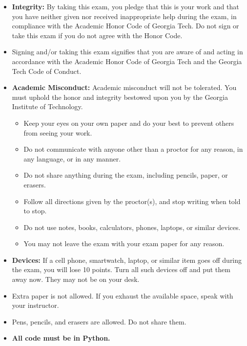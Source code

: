 \documentclass[11pt,addpoints]{exam}
\begin{document}
\begin{itemize}[leftmargin=1.35em,itemsep=0.25em,topsep=0.25em]
  \item \textbf{Integrity:} By taking this exam, you pledge that this is your work and that you have neither given nor received inappropriate help during the exam, in compliance with the Academic Honor Code of Georgia Tech. Do not sign or take this exam if you do not agree with the Honor Code.
  \item Signing and/or taking this exam signifies that you are aware of and acting in accordance with the Academic Honor Code of Georgia Tech and the Georgia Tech Code of Conduct.
  \item \textbf{Academic Misconduct:} Academic misconduct will not be tolerated. You must uphold the honor and integrity bestowed upon you by the Georgia Institute of Technology.
  \begin{itemize}[leftmargin=1.4em,itemsep=0.15em,topsep=0.15em]
    \item Keep your eyes on your own paper and do your best to prevent others from seeing your work.
    \item Do not communicate with anyone other than a proctor for any reason, in any language, or in any manner.
    \item Do not share anything during the exam, including pencils, paper, or erasers.
    \item Follow all directions given by the proctor(s), and stop writing when told to stop.
    \item Do not use notes, books, calculators, phones, laptops, or similar devices.
    \item You may not leave the exam with your exam paper for any reason.
  \end{itemize}
  \item \textbf{Devices:} If a cell phone, smartwatch, laptop, or similar item goes off during the exam, you will lose 10 points. Turn all such devices off and put them away now. They may not be on your desk.
  \item Extra paper is not allowed. If you exhaust the available space, speak with your instructor.
  \item Pens, pencils, and erasers are allowed. Do not share them.
  \item \textbf{All code must be in Python.}
\end{itemize}
\end{document}
